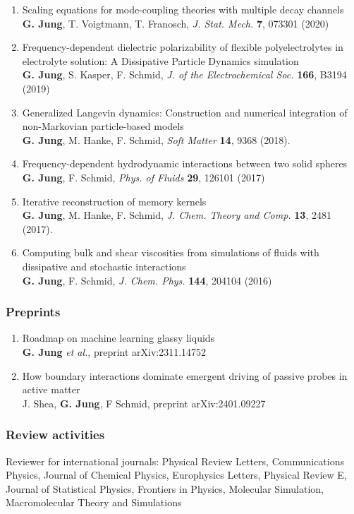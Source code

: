 \begin{enumerate}
	\item Scaling equations for mode-coupling theories with multiple decay channels\\
	\textbf{G. Jung}, T. Voigtmann, T. Franosch, \emph{J. Stat. Mech.} \textbf{7}, 073301 (2020)
	\item Frequency-dependent dielectric polarizability of flexible polyelectrolytes in electrolyte solution: A Dissipative Particle Dynamics simulation \\
	\textbf{G. Jung}, S. Kasper, F. Schmid, \emph{J. of the Electrochemical Soc.} \textbf{166}, B3194 (2019)
	\item Generalized Langevin dynamics: Construction and numerical integration of non-Markovian particle-based models\\
\textbf{	G. Jung}, M. Hanke, F. Schmid, \emph{Soft Matter} \textbf{14}, 9368 (2018).
	\item Frequency-dependent hydrodynamic interactions between two solid spheres\\
	\textbf{G. Jung}, F. Schmid, \emph{Phys. of Fluids} \textbf{29}, 126101 (2017)
	\item Iterative reconstruction of memory kernels  \\
	\textbf{G. Jung}, M. Hanke, F. Schmid, \emph{J. Chem. Theory and Comp.} \textbf{13}, 2481 (2017).
	\item Computing bulk and shear viscosities from simulations of fluids with dissipative and stochastic interactions\\
\textbf{	G. Jung}, F. Schmid, \emph{J. Chem. Phys.} \textbf{144}, 204104 (2016)
\end{enumerate}



\subsubsection*{Preprints}

\begin{enumerate}
	\item Roadmap on machine learning glassy liquids\\
\textbf{G. Jung} \emph{et al.},  preprint arXiv:2311.14752 

\item How boundary interactions dominate emergent driving of passive probes in active matter\\
J. Shea, \textbf{G. Jung}, F Schmid, preprint arXiv:2401.09227
\end{enumerate}

\subsubsection*{Review activities}
 Reviewer for international journals: Physical Review Letters, Communications Physics, Journal of Chemical Physics, Europhysics Letters, Physical Review E, Journal of Statistical Physics,  Frontiers in Physics, Molecular Simulation, Macromolecular Theory and Simulations


